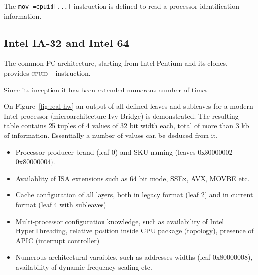 \documentclass[a4paper,10pt,oneside,unicode]{article}
\newcommand{\cpuid}{\textsc{cpuid} }
\begin{document}
%


The \texttt{mov =cpuid[...]} instruction is defined to read a processor identification information.

\subsection{Intel IA-32 and Intel 64}

The common PC architecture, starting from Intel Pentium and its clones, provides \cpuid~\cite{intelmanual-7vols, amd-sdm-vol1} instruction. 

Since its inception it has been extended numerous number of times.


On Figure~\ref{fig:real-hw} an output of all defined leaves and subleaves for a modern Intel processor (microarchitecture Ivy Bridge) is demonstrated. The resulting table contains 25 tuples of 4 values of 32 bit width each, total of more than 3 kb of information. Essentially a number of values can be deduced from it.
\begin{itemize}
    \item Processor producer brand (leaf 0) and SKU naming (leaves 0x80000002--0x80000004).
    \item Availablity of ISA extensions such as 64 bit mode, SSEx, AVX, MOVBE etc.
    \item Cache configuration of all layers, both in legacy format (leaf 2) and in current format (leaf 4 with subleaves)
    \item Multi-processor configuration knowledge, such as availability of Intel HyperThreading, relative position inside {CPU} package (topology), presence of {APIC} (interrupt controller)
    \item Numerous architectural varaibles, such as addresses widths (leaf 0x80000008), availability of dynamic frequency scaling etc.
\end{itemize}
\end{document}
